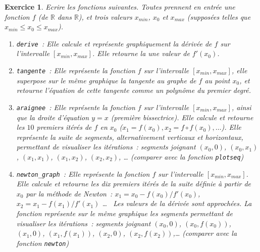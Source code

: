 \documentclass{article}
\newtheorem{exo}{Exercice}[section]
\begin{document}
\begin{exo}{\rm
Ecrire les fonctions suivantes. Toutes prennent en entr\'ee une fonction 
$f$ (de $\mathbb{R}$ dans $\mathbb{R}$), et trois valeurs $x_{min}$,
$x_0$ et $x_{max}$ (suppos\'ees telles que $x_{min}\leq x_0 \leq x_{max}$).
\begin{enumerate}
\item \verb+derive+~: 
Elle calcule et repr\'esente graphiquement 
la d\'eriv\'ee de $f$ sur l'intervalle $[x_{min},x_{max}]$. Elle retourne la
une valeur de $f'(x_0)$.
\item \verb+tangente+~: 
Elle repr\'esente la fonction $f$ sur l'intervalle $[x_{min},x_{max}]$, elle
superpose sur le m\^eme graphique la tangente au graphe de $f$ au point $x_0$, 
et retourne l'\'equation de cette tangente comme un polyn\^ome du premier
degr\'e.
\item \verb+araignee+~:
Elle repr\'esente la fonction $f$ sur l'intervalle $[x_{min},x_{max}]$,
ainsi que la droite d'\'equation $y=x$ (premi\`ere bissectrice).
Elle calcule et retourne les $10$ premiers it\'er\'es de $f$ en $x_0$
($x_1=f(x_0), x_2=f\circ f(x_0), \ldots$). Elle repr\'esente la suite de
segments, alternativement verticaux et horizontaux, permettant de visualiser
les it\'erations~: segments joignant $(x_0,0)$, $(x_0,x_1)$, $(x_1,x_1)$,
$(x_1,x_2)$, $(x_2,x_2)$, \ldots
(comparer avec la fonction \verb|plotseq|)
\item \verb+newton_graph+~:
Elle repr\'esente la fonction $f$ sur l'intervalle $[x_{min},x_{max}]$.
Elle calcule et retourne les dix premiers it\'er\'es de la suite d\'efinie 
\`a partir de $x_0$ par la m\'ethode de Newton~: $x_1=x_0 -f(x_0)/f'(x_0)$,
$x_2=x_1 - f(x_1)/f'(x_1)$ \ldots~  Les valeurs de la d\'eriv\'ee sont
approch\'ees. La fonction repr\'esente sur le m\^eme graphique les
segments permettant de visualiser les it\'erations~: segments joignant 
$(x_0,0)$, $(x_0,f(x_0))$, $(x_1,0)$,
$(x_1,f(x_1))$, $(x_2,0)$, $(x_2,f(x_2))$,\ldots
(comparer avec la fonction \verb|newton|)
\end{enumerate}
}\end{exo}
\end{document}
